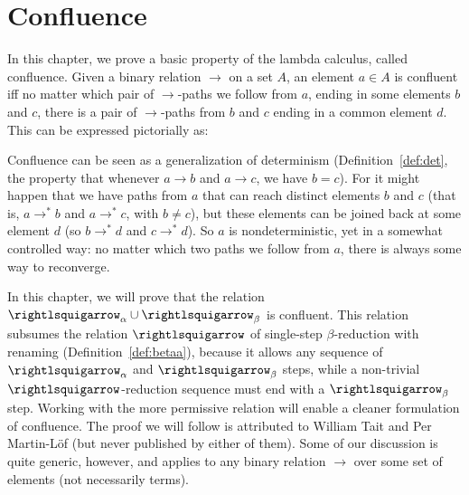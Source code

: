 \chapter{Confluence}

In this chapter, we prove a basic property of the lambda calculus,
called confluence. Given a binary relation $\to$ on
a set $A$, an element $a \in A$ is confluent iff no matter which pair
of $\to$-paths we follow from $a$, ending in some elements $b$ and
$c$, there is a pair of $\to$-paths from $b$ and $c$ ending in a
common element $d$.  This can be expressed pictorially as:

\begin{center}
\end{center}

Confluence can be seen as a generalization of determinism
(Definition~\ref{def:det}, the property that whenever $a \to b$ and $a
\to c$, we have $b = c$).  For it might happen that we have paths from
$a$ that can reach distinct elements $b$ and $c$ (that is, $a \to^* b$
and $a \to^* c$, with $b \neq c$), but these elements can be joined
back at some element $d$ (so $b \to^*d$ and $c\to^*d$).  So $a$ is
nondeterministic, yet in a somewhat controlled way: no matter
which two paths we follow from $a$, there is always some way to
reconverge.

In this chapter, we will prove that the relation $\curva_\alpha \cup
\curva_\beta$ is confluent.  This relation subsumes the relation
$\betaa$ of single-step $\beta$-reduction with renaming
(Definition~\ref{def:betaa}), because it allows any sequence of
$\curva_\alpha$ and $\curva_\beta$ steps, while a non-trivial
$\betaa$-reduction sequence must end with a $\curva_\beta$ step.
Working with the more permissive relation will enable a cleaner
formulation of confluence.  The proof we will follow is attributed to
William Tait and Per Martin-L\"of (but never published by either of
them).  Some of our discussion is quite generic, however, and applies
to any binary relation $\to$ over some set of elements (not
necessarily terms).

